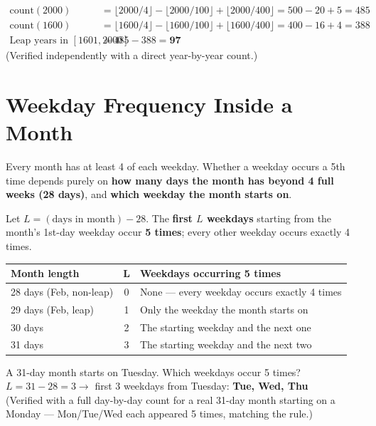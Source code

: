\documentclass[11pt]{article}
\begin{document}
\begin{examplebox}
\begin{align*}
\text{count}(2000) &= \lfloor 2000/4\rfloor - \lfloor 2000/100\rfloor + \lfloor 2000/400\rfloor = 500-20+5 = 485 \\
\text{count}(1600) &= \lfloor 1600/4\rfloor - \lfloor 1600/100\rfloor + \lfloor 1600/400\rfloor = 400-16+4 = 388 \\
\text{Leap years in }[1601,2000] &= 485-388 = \textbf{97}
\end{align*}
(Verified independently with a direct year-by-year count.)
\end{examplebox}

\section{Weekday Frequency Inside a Month}

Every month has at least 4 of each weekday. Whether a weekday occurs a 5th time depends purely on
\textbf{how many days the month has beyond 4 full weeks (28 days)}, and \textbf{which weekday the
month starts on}.

\begin{formulabox}[Rule]
Let $L = (\text{days in month}) - 28$. The \textbf{first $L$ weekdays} starting from the month's
1st-day weekday occur \textbf{5 times}; every other weekday occurs exactly 4 times.
\end{formulabox}

\begin{center}
\begin{tabular}{lcl}
\toprule
\textbf{Month length} & \textbf{L} & \textbf{Weekdays occurring 5 times} \\
\midrule
28 days (Feb, non-leap) & 0 & None --- every weekday occurs exactly 4 times \\
29 days (Feb, leap) & 1 & Only the weekday the month starts on \\
30 days & 2 & The starting weekday and the next one \\
31 days & 3 & The starting weekday and the next two \\
\bottomrule
\end{tabular}
\end{center}

\begin{examplebox}
A 31-day month starts on Tuesday. Which weekdays occur 5 times? \\
$L = 31-28 = 3 \to$ first 3 weekdays from Tuesday: \textbf{Tue, Wed, Thu} \\
(Verified with a full day-by-day count for a real 31-day month starting on a Monday --- Mon/Tue/Wed
each appeared 5 times, matching the rule.)
\end{examplebox}
\end{document}
